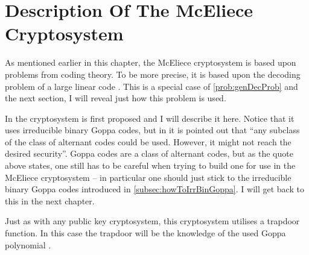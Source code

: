 \section{Description Of The McEliece Cryptosystem}
\label{sec:descOrigMceliece}

As mentioned earlier in this chapter, the McEliece cryptosystem is based upon problems from coding theory. To be more precise, it is based upon the decoding problem of a large linear code \cite{KI}. This is a special case of \cref{prob:genDecProb} and the next section, I will reveal just how this problem is used.

In \cite{mceliece} the cryptosystem is first proposed and I will describe it here. Notice that it uses irreducible binary Goppa codes, but in \cite[p. 6]{EOS} it is pointed out that ``any subclass of the class of alternant codes could be used. However, it might not reach the desired security''. Goppa codes are a class of alternant codes, but as the quote above states, one still has to be careful when trying to build one for use in the McEliece cryptosystem -- in particular one should just stick to the irreducible binary Goppa codes introduced in \cref{subsec:howToIrrBinGoppa}. I will get back to this in the next chapter.

Just as with any public key cryptosystem, this cryptosystem utilises a trapdoor function. In this case the trapdoor will be the knowledge of the used Goppa polynomial \cite{EOS}.

